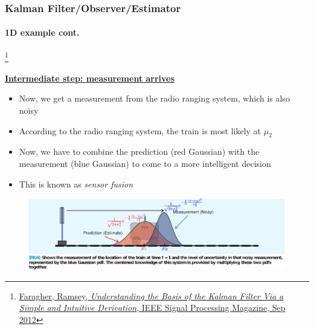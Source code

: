 \documentclass{beamer}
\newenvironment{changemargin}[2]
	{
	  	\begin{list}{}
		{
			\setlength{\topsep}{0pt}%
			\setlength{\leftmargin}{#1}%
			\setlength{\rightmargin}{#2}%
			\setlength{\listparindent}{\parindent}%
			\setlength{\itemindent}{\parindent}%
			\setlength{\parsep}{\parskip}%
		}
	  	\item[]
		}
		{\end{list}
	}
\begin{document}
\begin{frame}[plain]
\frametitle{Kalman Filter/Observer/Estimator}
\framesubtitle{1D example \tiny cont.}

\footnote{\tiny\hspace{-0.23in} \href{http://www.cl.cam.ac.uk/~rmf25/papers/Understanding the Basis of the Kalman Filter.pdf}{Faragher, Ramsey, \emph{Understanding the Basis of the Kalman Filter Via a Simple and Intuitive Derivation}, IEEE Signal Processing Magazine, Sep 2012}}
\scriptsize
\begin{changemargin}{-1.3in}{0in}
\underline{\textbf{Intermediate step: measurement arrives}}
\begin{itemize}\scriptsize
\item Now, we get a measurement from the radio ranging system, which is also noisy
\item According to the radio ranging system, the train is most likely at  $\mu_2$
\item Now, we have to combine the prediction (red Gaussian) with the measurement (blue Gaussian) to come to a more intelligent decision
\item This is known as \emph{sensor fusion}
\end{itemize}
\begin{figure}[h]
\centering
\includegraphics[width=1.35\textwidth]{figs/2012_MAG_Understanding_the_Basis_of_the_Kalman_Filter_fig4.pdf}
\end{figure}
\end{changemargin}
\end{frame}
\end{document}
